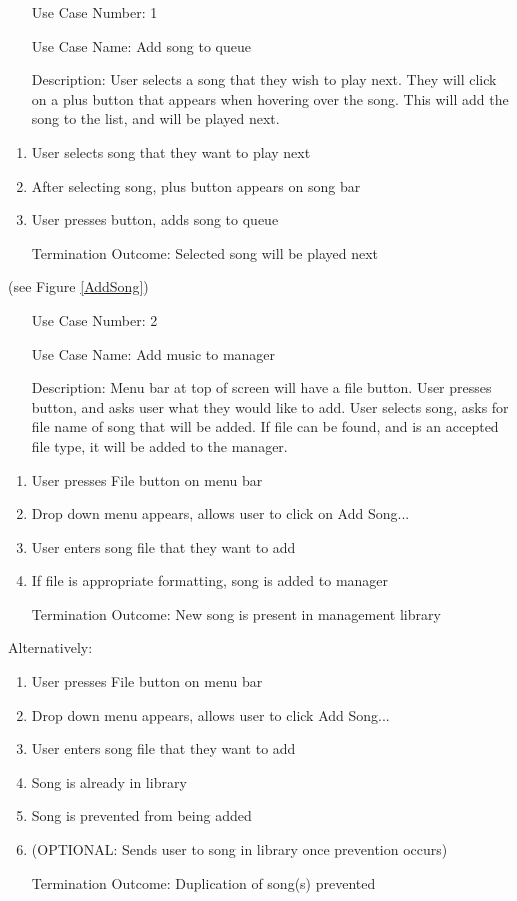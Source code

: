 \documentclass[10pt,conference,onecolumn,compsoc]{IEEEtran}
\begin{document}
\begin{itemize}
\item[Use Case Number:] 1
\item[Use Case Name:] Add song to queue
\item[Description:] User selects a song that they wish to play next. They will click on a plus button that appears when hovering over the song. This will add the song to the list, and will be played next.
\end{itemize}

\begin{enumerate}
\item User selects song that they want to play next
\item After selecting song, plus button appears on song bar
\item User presses button, adds song to queue
\item[Termination Outcome:] Selected song will be played next
\end{enumerate}

(see Figure \ref{AddSong})

\begin{itemize}
\item[Use Case Number:] 2
\item[Use Case Name:] Add music to manager
\item[Description:] Menu bar at top of screen will have a file button. User presses button, and asks user what they would like to add. User selects song, asks for file name of song that will be added. If file can be found, and is an accepted file type, it will be added to the manager.
\end{itemize}

\begin{enumerate}
\item User presses File button on menu bar
\item Drop down menu appears, allows user to click on Add Song...
\item User enters song file that they want to add
\item If file is appropriate formatting, song is added to manager
\item [Termination Outcome:] New song is present in management library
\end{enumerate}

Alternatively:
\begin{enumerate}
\item User presses File button on menu bar
\item Drop down menu appears, allows user to click Add Song...
\item User enters song file that they want to add
\item Song is already in library
\item Song is prevented from being added
\item (OPTIONAL: Sends user to song in library once prevention occurs)
\item [Termination Outcome:] Duplication of song(s) prevented
\end{enumerate}
\end{document}
